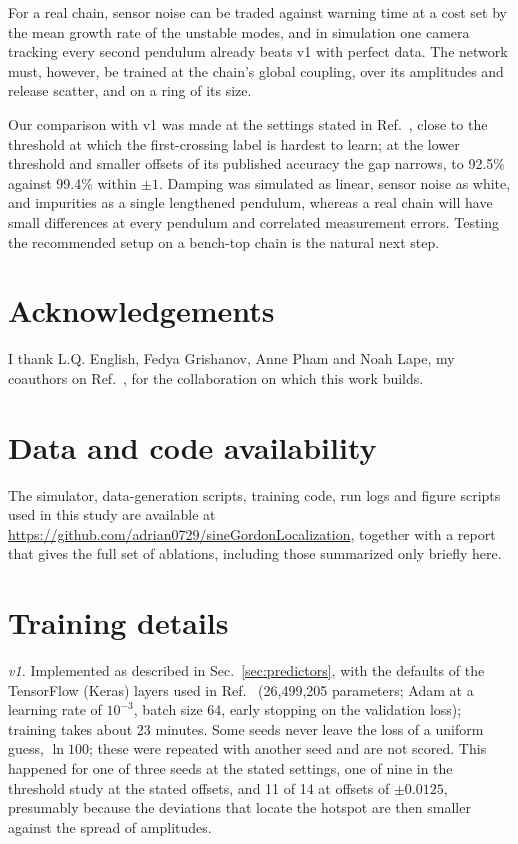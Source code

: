 \documentclass[11pt]{article}
\begin{document}
For a real chain, sensor noise can be traded against warning time at a cost set by the mean growth rate of the unstable modes, and in simulation one camera tracking every second pendulum already beats v1 with perfect data. The network must, however, be trained at the chain's global coupling, over its amplitudes and release scatter, and on a ring of its size.

Our comparison with v1 was made at the settings stated in Ref.~\cite{mittal2026jand}, close to the threshold at which the first-crossing label is hardest to learn; at the lower threshold and smaller offsets of its published accuracy the gap narrows, to 92.5\% against 99.4\% within $\pm1$. Damping was simulated as linear, sensor noise as white, and impurities as a single lengthened pendulum, whereas a real chain will have small differences at every pendulum and correlated measurement errors. Testing the recommended setup on a bench-top chain is the natural next step.

\section*{Acknowledgements}

I thank L.Q. English, Fedya Grishanov, Anne Pham and Noah Lape, my coauthors on Ref.~\cite{mittal2026jand}, for the collaboration on which this work builds.

\section*{Data and code availability}

The simulator, data-generation scripts, training code, run logs and figure scripts used in this study are available at \url{https://github.com/adrian0729/sineGordonLocalization}, together with a report that gives the full set of ablations, including those summarized only briefly here.


\appendix

\section{Training details}
\label{app:training}

\textit{v1.} Implemented as described in Sec.~\ref{sec:predictors}, with the defaults of the TensorFlow (Keras) layers used in Ref.~\cite{mittal2026jand} (26,499,205 parameters; Adam \cite{kingma2015adam} at a learning rate of $10^{-3}$, batch size 64, early stopping on the validation loss); training takes about 23 minutes. Some seeds never leave the loss of a uniform guess, $\ln100$; these were repeated with another seed and are not scored. This happened for one of three seeds at the stated settings, one of nine in the threshold study at the stated offsets, and 11 of 14 at offsets of $\pm0.0125$, presumably because the deviations that locate the hotspot are then smaller against the spread of amplitudes.
\end{document}
